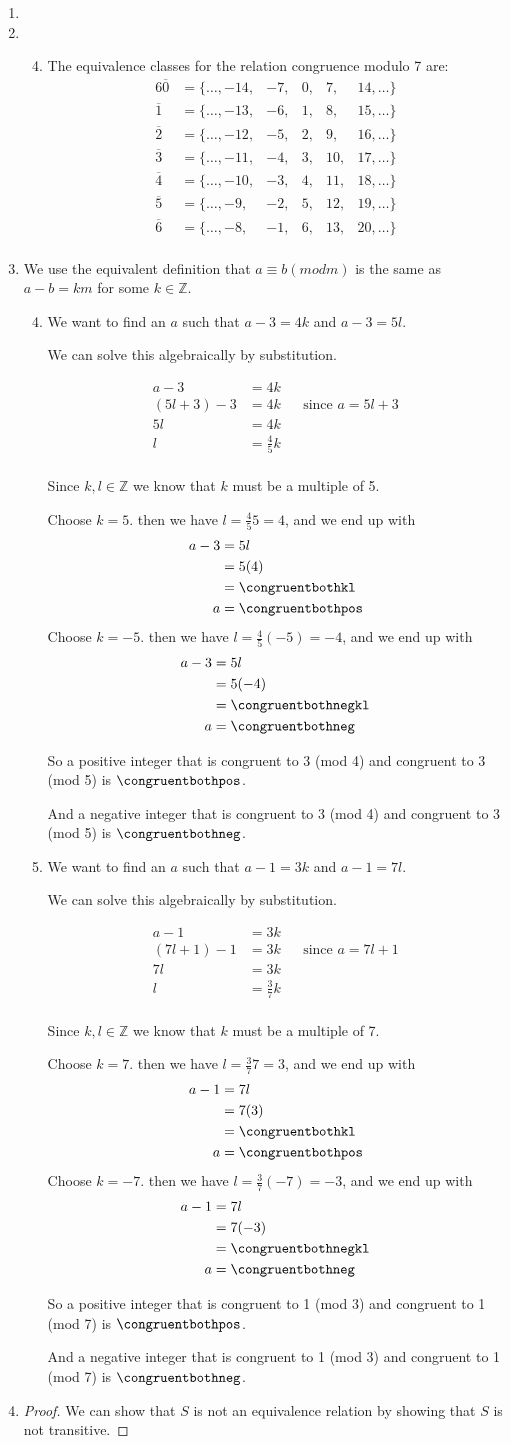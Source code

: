 \documentclass[12pt,letterpaper]{article}
\newcommand*\congruentboth[3]{%
  \MULTIPLY{#2}{#3}{\congruentbothkl}
  \MULTIPLY{-1}{\congruentbothkl}{\congruentbothnegkl}
  \ADD{\congruentbothkl}{#1}{\congruentbothpos}
  \ADD{\congruentbothnegkl}{#1}{\congruentbothneg}

  We want to find an $a$ such that $a - #1 = #2k$ and $a - #1 = #3l$.

  We can solve this algebraically by substitution.

  \begin{align*}
    a - #1 &= #2k \\
    \left(#3l + #1\right) - #1 &= #2k && \text{since } a = #3l + #1 \\
    #3l &= #2k \\
    l &= \frac{#2}{#3}k \\
  \end{align*}

  Since $k, l \in \mathbb{Z}$ we know that $k$ must be a multiple of #3.

  Choose $k = #3$.
  then we have $l = \frac{#2}{#3}#3 = #2$,
  and we end up with
  \begin{align*}
    a - #1 &= #3l \\
    &= #3(#2) \\
    &= \congruentbothkl \\
    a &= \congruentbothpos \\
  \end{align*}
  Choose $k = -#3$.
  then we have $l = \frac{#2}{#3}\left(-#3\right) = -#2$,
  and we end up with
  \begin{align*}
    a - #1 &= #3l \\
    &= #3(-#2) \\
    &= \congruentbothnegkl \\
    a &= \congruentbothneg \\
  \end{align*}

  So a positive integer that is congruent to #1 (mod #2) and congruent to #1 (mod #3) is $\congruentbothpos$.

  And a negative integer that is congruent to #1 (mod #2) and congruent to #1 (mod #3) is $\congruentbothneg$.
}
\begin{document}
\begin{enumerate}
\begin{enumerate}
\begin{enumerate}
              Three elements of $635 / R$ are $30, 31$, and $32$,
              since the tens place of 635 is 3, the tens place of 30 is 3, the tens place of 31 is 3, and the tens place of 32 is 3.
            \item
            \item
            \setcounter{enumiii}{7}
            \item
          \end{enumerate}
        \item
        \setcounter{enumii}{7}
        \item
          \begin{enumerate}
            \setcounter{enumiii}{3}
            \item
              The equivalence classes for the relation congruence modulo 7 are:
              \begin{alignat*}{6}
                \overline{0} &= \{\dots, -14, & -7, & 0, & 7,  & 14, \dots\} \\
                \overline{1} &= \{\dots, -13, & -6, & 1, & 8,  & 15, \dots\} \\
                \overline{2} &= \{\dots, -12, & -5, & 2, & 9,  & 16, \dots\} \\
                \overline{3} &= \{\dots, -11, & -4, & 3, & 10, & 17, \dots\} \\
                \overline{4} &= \{\dots, -10, & -3, & 4, & 11, & 18, \dots\} \\
                \overline{5} &= \{\dots, -9,  & -2, & 5, & 12, & 19, \dots\} \\
                \overline{6} &= \{\dots, -8,  & -1, & 6, & 13, & 20, \dots\} \\
              \end{alignat*}
          \end{enumerate}
        \item
          We use the equivalent definition that $a \equiv b (mod m)$
          is the same as $a - b = k m$ for some $k \in \mathbb{Z}$.
          \begin{enumerate}
            \setcounter{enumiii}{3}
            \item
              \congruentboth{3}{4}{5}
            \item
              \congruentboth{1}{3}{7}
          \end{enumerate}
        \setcounter{enumii}{10}
        \item
          \begin{proof}
            We can show that $S$ is not an equivalence relation by showing that $S$ is not transitive.


\end{proof}
\end{enumerate}
\end{enumerate}
\end{document}
